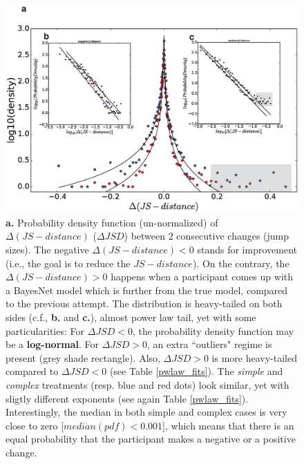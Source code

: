 \begin{figure}[h!]
\begin{center}
\includegraphics[width=15cm]{figures/pdf_JSD.eps}
\caption{{\bf a.} Probability density function (un-normalized) of $\Delta(JS-distance)$ ($\Delta JSD$) between 2 consecutive changes (jump sizes). The negative $\Delta(JS-distance) < 0$ stands for improvement (i.e., the goal is to reduce the $JS-distance$). On the contrary, the $\Delta(JS-distance) >  0$ happens when a participant comes up with a BayesNet model which is further from the true model, compared to the previous attempt. The distribution is heavy-tailed on both sides (c.f., {\bf b.} and {\bf c.}), almost power law tail, yet with some particularities: For $\Delta JSD < 0$, the probability density function may be a {\bf log-normal}. For $\Delta JSD > 0$, an extra ``outliers" regime is present (grey shade rectangle). Also, $\Delta JSD > 0$ is more heavy-tailed compared to $\Delta JSD < 0$ (see Table \ref{pwlaw_fits}). The {\it simple} and {\it complex} treatments (resp. blue and red dots) look similar, yet with sligtly different exponents (see again Table \ref{pwlaw_fits}). Interestingly, the median in both simple and complex cases is very close to zero [$median(pdf) < 0.001$], which means that there is an equal probability that the participant makes a negative or a positive change.}
\label{fig:jump_sizes}
\end{center}
\end{figure}

